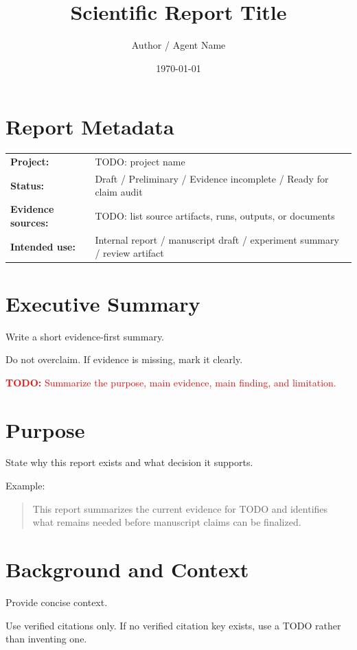 \documentclass[11pt]{article}
\title{Scientific Report Title}
\author{Author / Agent Name}
\date{\today}
\newcommand{\todo}[1]{\textcolor{red}{\textbf{TODO:} #1}}
\begin{document}
\maketitle

\section*{Report Metadata}

\begin{tabular}{ll}
\textbf{Project:} & TODO: project name \\
\textbf{Status:} & Draft / Preliminary / Evidence incomplete / Ready for claim audit \\
\textbf{Evidence sources:} & TODO: list source artifacts, runs, outputs, or documents \\
\textbf{Intended use:} & Internal report / manuscript draft / experiment summary / review artifact \\
\end{tabular}

\section*{Executive Summary}

Write a short evidence-first summary.

Do not overclaim. If evidence is missing, mark it clearly.

\todo{Summarize the purpose, main evidence, main finding, and limitation.}

\section{Purpose}

State why this report exists and what decision it supports.

Example:

\begin{quote}
This report summarizes the current evidence for TODO and identifies what remains needed before manuscript claims can be finalized.
\end{quote}

\section{Background and Context}

Provide concise context.

Use verified citations only. If no verified citation key exists, use a TODO rather than inventing one.
\end{document}
